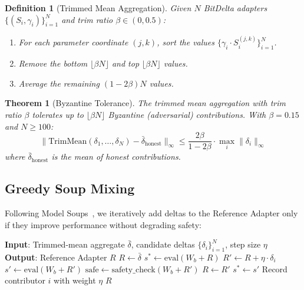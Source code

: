 \documentclass[11pt,letterpaper]{article}
\newtheorem{theorem}{Theorem}[section]
\newtheorem{definition}{Definition}[section]
\begin{document}
\begin{definition}[Trimmed Mean Aggregation]
Given $N$ BitDelta adapters $\{(S_i, \gamma_i)\}_{i=1}^N$ and trim ratio $\beta \in (0, 0.5)$:
\begin{enumerate}
    \item For each parameter coordinate $(j, k)$, sort the values $\{\gamma_i \cdot S_i^{(j,k)}\}_{i=1}^N$.
    \item Remove the bottom $\lfloor \beta N \rfloor$ and top $\lfloor \beta N \rfloor$ values.
    \item Average the remaining $(1 - 2\beta)N$ values.
\end{enumerate}
\end{definition}

\begin{theorem}[Byzantine Tolerance]
\label{thm:byzantine}
The trimmed mean aggregation with trim ratio $\beta$ tolerates up to $\lfloor \beta N \rfloor$ Byzantine (adversarial) contributions. With $\beta = 0.15$ and $N \geq 100$:
\[
\|\text{TrimMean}(\delta_1, \ldots, \delta_N) - \bar{\delta}_{\text{honest}}\|_\infty \leq \frac{2\beta}{1-2\beta} \cdot \max_i \|\delta_i\|_\infty
\]
where $\bar{\delta}_{\text{honest}}$ is the mean of honest contributions.
\end{theorem}

\subsection{Greedy Soup Mixing}

Following Model Soups~\cite{wortsman2022model}, we iteratively add deltas to the Reference Adapter only if they improve performance without degrading safety:

\begin{algorithm}[t]
\caption{Greedy DeltaSoup Construction}
\label{alg:greedy_soup}
\begin{algorithmic}[1]
\STATE \textbf{Input}: Trimmed-mean aggregate $\bar{\delta}$, candidate deltas $\{\delta_i\}_{i=1}^N$, step size $\eta$
\STATE \textbf{Output}: Reference Adapter $R$
\STATE $R \leftarrow \bar{\delta}$
\STATE $s^* \leftarrow \text{eval}(W_b + R)$
    \STATE $R' \leftarrow R + \eta \cdot \delta_i$
    \STATE $s' \leftarrow \text{eval}(W_b + R')$
    \STATE $\text{safe} \leftarrow \text{safety\_check}(W_b + R')$
        \STATE $R \leftarrow R'$
        \STATE $s^* \leftarrow s'$
        \STATE Record contributor $i$ with weight $\eta$
    \ENDIF
\ENDFOR
\RETURN $R$
\end{algorithmic}
\end{algorithm}
\end{document}
